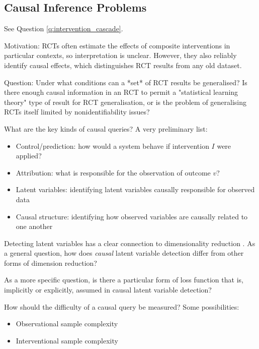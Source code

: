 \subsection{Causal Inference Problems}

\begin{question}
    See Question \ref{q:intervention_cascade}.
    
    Motivation: RCTs often estimate the effects of composite interventions in particular contexts, so interpretation is unclear. However, they also reliably identify causal effects, which distinguishes RCT results from any old dataset.
    
    Question: Under what conditions can a *set* of RCT results be generalised? Is there enough causal information in an RCT to permit a "statistical learning theory" type of result for RCT generalisation, or is the problem of generalising RCTs itself limited by nonidentifiability issues?
\end{question}

\begin{question}\label{q:causal_queries}
    What are the key kinds of causal queries? A very preliminary list:
    \begin{itemize}
        \item Control/prediction: how would a system behave if intervention $I$ were applied?
        \item Attribution: what is responsible for the observation of outcome $v$?
        \item Latent variables: identifying latent variables causally responsible for observed data
        \item Causal structure: identifying how observed variables are causally related to one another
    \end{itemize}
\end{question}

\begin{question}
    Detecting latent variables has a clear connection to dimensionality reduction \cite{kummerfeld_causal_2016}. As a general question, how does \emph{causal} latent variable detection differ from other forms of dimension reduction?
    
    As a more specific question, is there a particular form of loss function that is, implicitly or explicitly, assumed in causal latent variable detection? 
\end{question}

\begin{question}\label{q:causal_query_difficulty}
    How should the difficulty of a causal query be measured?
    Some possibilities:
    \begin{itemize}
        \item Observational sample complexity
        \item Interventional sample complexity
    \end{itemize}
\end{question}

